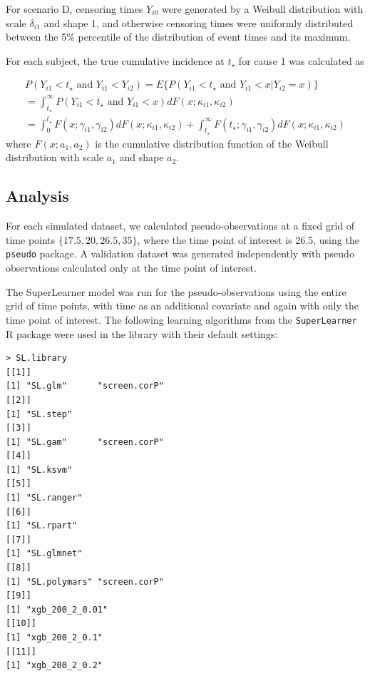 \documentclass{statsoc}
\begin{document}
For scenario D, censoring times $Y_{i0}$ were generated by a Weibull distribution with scale $\delta_{i1}$ and shape 1, and otherwise censoring times were uniformly distributed between the 5\% percentile of the distribution of event times and its maximum. 

For each subject, the true cumulative incidence at $t_{\star}$ for cause 1 was calculated as

\begin{equation*}
\begin{split}
P(Y_{i1} < t_{\star} \mbox{ and } Y_{i1} < Y_{i2}) = E\{P(Y_{i1} < t_{\star} \mbox{ and } Y_{i1} < x | Y_{i2} = x)\} \\
= \int_{t_\star}^\infty P(Y_{i1} < t_{\star} \mbox{ and } Y_{i1} < x) dF(x; \kappa_{i1}, \kappa_{i2}) \\
 = \int_{0}^{t_{\star}} F(x; \gamma_{i1}, \gamma_{i2}) dF(x; \kappa_{i1}, \kappa_{i2})  + 
\int_{t_{\star}}^\infty F(t_{\star}; \gamma_{i1}, \gamma_{i2}) dF(x; \kappa_{i1}, \kappa_{i2}) 
\end{split}
\end{equation*}
where $F(x; a_1, a_2)$ is the cumulative distribution function of the Weibull distribution with scale $a_1$ and shape $a_2$. 


\subsection{Analysis}

For each simulated dataset, we calculated pseudo-observations at a fixed  grid of time points $\{17.5, 20, 26.5, 35\}$, where the time point of interest is 26.5, using the \texttt{pseudo} package. A validation dataset was generated independently with pseudo observations calculated only at the time point of interest. 

The SuperLearner model was run for the pseudo-observations using the entire grid of time points, with time as an additional covariate and again with only the time point of interest. The following learning algorithms from the \texttt{SuperLearner} R package were used in the library with their default settings: 

\begin{verbatim}
> SL.library
[[1]]
[1] "SL.glm"      "screen.corP"
[[2]]
[1] "SL.step"
[[3]]
[1] "SL.gam"      "screen.corP"
[[4]]
[1] "SL.ksvm"
[[5]]
[1] "SL.ranger"
[[6]]
[1] "SL.rpart"
[[7]]
[1] "SL.glmnet"
[[8]]
[1] "SL.polymars" "screen.corP"
[[9]]
[1] "xgb_200_2_0.01"
[[10]]
[1] "xgb_200_2_0.1"
[[11]]
[1] "xgb_200_2_0.2"
\end{verbatim}
\end{document}
